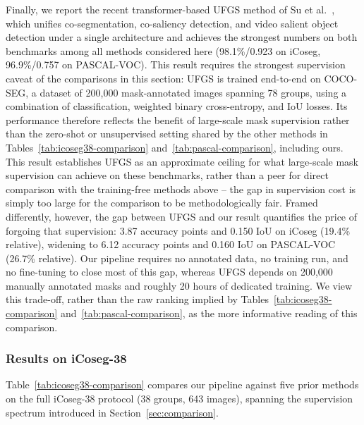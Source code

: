 Finally, we report the recent transformer-based UFGS method of Su et al.~\cite{su2024ufgs}, which unifies co-segmentation, co-saliency detection, and video salient object detection under a single architecture and achieves the strongest numbers on both benchmarks among all methods considered here (98.1\%/0.923 on iCoseg, 96.9\%/0.757 on PASCAL-VOC). This result requires the strongest supervision caveat of the comparisons in this section: UFGS is trained end-to-end on COCO-SEG, a dataset of 200{,}000 mask-annotated images spanning 78 groups, using a combination of classification, weighted binary cross-entropy, and IoU losses. Its performance therefore reflects the benefit of large-scale mask supervision rather than the zero-shot or unsupervised setting shared by the other methods in Tables~\ref{tab:icoseg38-comparison} and~\ref{tab:pascal-comparison}, including ours. This result establishes UFGS as an approximate ceiling for what large-scale mask supervision can achieve on these benchmarks, rather than a peer for direct comparison with the training-free methods above -- the gap in supervision cost is simply too large for the comparison to be methodologically fair. Framed differently, however, the gap between UFGS and our result quantifies the price of forgoing that supervision: 3.87 accuracy points and 0.150 IoU on iCoseg (19.4\% relative), widening to 6.12 accuracy points and 0.160 IoU on PASCAL-VOC (26.7\% relative). Our pipeline requires no annotated data, no training run, and no fine-tuning to close most of this gap, whereas UFGS depends on 200,000 manually annotated masks and roughly 20 hours of dedicated training. We view this trade-off, rather than the raw ranking implied by Tables~\ref{tab:icoseg38-comparison} and~\ref{tab:pascal-comparison}, as the more informative reading of this comparison.

\subsubsection{Results on iCoseg-38}
\label{sec:results-icoseg}

Table~\ref{tab:icoseg38-comparison} compares our pipeline against five prior methods on the full iCoseg-38 protocol (38 groups, 643 images), spanning the supervision spectrum introduced in Section~\ref{sec:comparison}.

